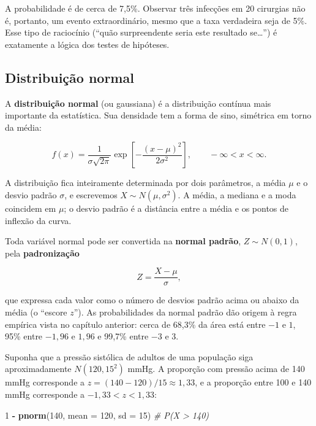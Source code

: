 \documentclass[
]{book}
\newenvironment{Shaded}{\begin{snugshade}}{\end{snugshade}}
\newcommand{\AttributeTok}[1]{\textcolor[rgb]{0.13,0.29,0.53}{#1}}
\newcommand{\CommentTok}[1]{\textcolor[rgb]{0.56,0.35,0.01}{\textit{#1}}}
\newcommand{\DecValTok}[1]{\textcolor[rgb]{0.00,0.00,0.81}{#1}}
\newcommand{\FunctionTok}[1]{\textcolor[rgb]{0.13,0.29,0.53}{\textbf{#1}}}
\newcommand{\NormalTok}[1]{#1}
\newcommand{\SpecialCharTok}[1]{\textcolor[rgb]{0.81,0.36,0.00}{\textbf{#1}}}
\begin{document}
A probabilidade é de cerca de 7,5\%. Observar três infecções em 20 cirurgias não é, portanto, um evento extraordinário, mesmo que a taxa verdadeira seja de 5\%. Esse tipo de raciocínio (``quão surpreendente seria este resultado se\ldots{}'') é exatamente a lógica dos testes de hipóteses.

\subsection{Distribuição normal}\label{distribuiuxe7uxe3o-normal}

A \textbf{distribuição normal} (ou gaussiana) é a distribuição contínua mais importante da estatística. Sua densidade tem a forma de sino, simétrica em torno da média:

\[
f(x) = \frac{1}{\sigma\sqrt{2\pi}}\exp\left[-\frac{(x - \mu)^2}{2\sigma^2}\right], \qquad -\infty < x < \infty.
\]

A distribuição fica inteiramente determinada por dois parâmetros, a média \(\mu\) e o desvio padrão \(\sigma\), e escrevemos \(X \sim N(\mu, \sigma^2)\). A média, a mediana e a moda coincidem em \(\mu\); o desvio padrão é a distância entre a média e os pontos de inflexão da curva.

Toda variável normal pode ser convertida na \textbf{normal padrão}, \(Z \sim N(0, 1)\), pela \textbf{padronização}

\[
Z = \frac{X - \mu}{\sigma},
\]

que expressa cada valor como o número de desvios padrão acima ou abaixo da média (o ``escore \(z\)''). As probabilidades da normal padrão dão origem à regra empírica vista no capítulo anterior: cerca de 68,3\% da área está entre \(-1\) e \(1\), 95\% entre \(-1{,}96\) e \(1{,}96\) e 99,7\% entre \(-3\) e \(3\).

Suponha que a pressão sistólica de adultos de uma população siga aproximadamente \(N(120, 15^2)\) mmHg. A proporção com pressão acima de 140 mmHg corresponde a \(z = (140 - 120)/15 \approx 1{,}33\), e a proporção entre 100 e 140 mmHg corresponde a \(-1{,}33 < z < 1{,}33\):

\begin{Shaded}
\begin{Highlighting}[]
\DecValTok{1} \SpecialCharTok{{-}} \FunctionTok{pnorm}\NormalTok{(}\DecValTok{140}\NormalTok{, }\AttributeTok{mean =} \DecValTok{120}\NormalTok{, }\AttributeTok{sd =} \DecValTok{15}\NormalTok{)                          }\CommentTok{\# P(X \textgreater{} 140)}
\end{Highlighting}
\end{Shaded}
\end{document}
